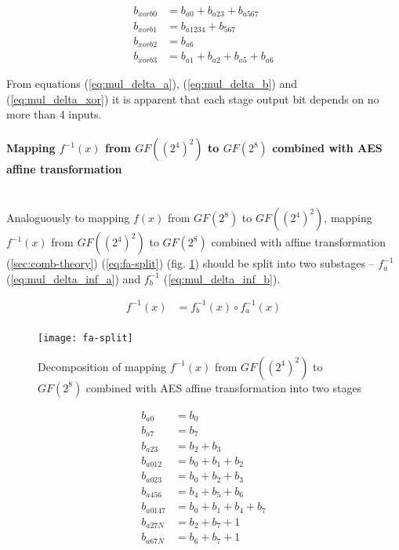 \begin{equation}
\label{eq:mul_delta_xor}
\begin{aligned}
b_{xorb0} &= b_{a0} + b_{a23} + b_{a567}       \\
b_{xorb1} &= b_{a1234} + b_{567}               \\
b_{xorb2} &= b_{a6}                            \\
b_{xorb3} &= b_{a1} + b_{a2} + b_{a5} + b_{a6}
\end{aligned}
\end{equation}

From equations (\ref{eq:mul_delta_a}), (\ref{eq:mul_delta_b}) and (\ref{eq:mul_delta_xor}) it is apparent that each stage output bit depends on no more than 4 inputs.




\paragraph{Mapping $f^{-1}(x)$ from $GF((2^4)^2)$ to $GF(2^8)$ combined with AES affine transformation}\mbox{}\\
Analoguously to mapping $f(x)$ from $GF(2^8)$ to $GF((2^4)^2)$, mapping $f^{-1}(x)$ from $GF((2^4)^2)$ to $GF(2^8)$ combined with affine transformation (\ref{sec:comb-theory}) (\ref{eq:fa-split}) (fig. \ref{fig:fa-split}) should be split into two substages --  $f^{-1}_a$ (\ref{eq:mul_delta_inf_a}) and $f^{-1}_b$ (\ref{eq:mul_delta_inf_b}).

\begin{equation}
\label{eq:fa-split}
\begin{aligned}
f^{-1}(x) &= f_b^{-1}(x) \circ f_a^{-1}(x) \\
\end{aligned}
\end{equation}

\begin{figure}[!h]
\centering
\texttt{[image: fa-split]}
\caption{Decomposition of mapping $f^{-1}(x)$ from $GF((2^4)^2)$ to $GF(2^8)$ combined with AES affine transformation into two stages}
\label{fig:fa-split}
\end{figure}


\begin{equation}
\label{eq:mul_delta_inf_a}
\begin{aligned}
b_{a0}    &= b_0                    \\
b_{a7}    &= b_7                    \\
b_{a23}   &= b_2 + b_3              \\
b_{a012}  &= b_0 + b_1 + b_2        \\
b_{a023}  &= b_0 + b_2 + b_3        \\
b_{a456}  &= b_4 + b_5 + b_6        \\
b_{a0147} &= b_0 + b_1 + b_4 + b_7  \\
b_{a27N}  &= b_2 + b_7 + 1          \\
b_{a67N}  &= b_6 + b_7 + 1            
\end{aligned}
\end{equation}

